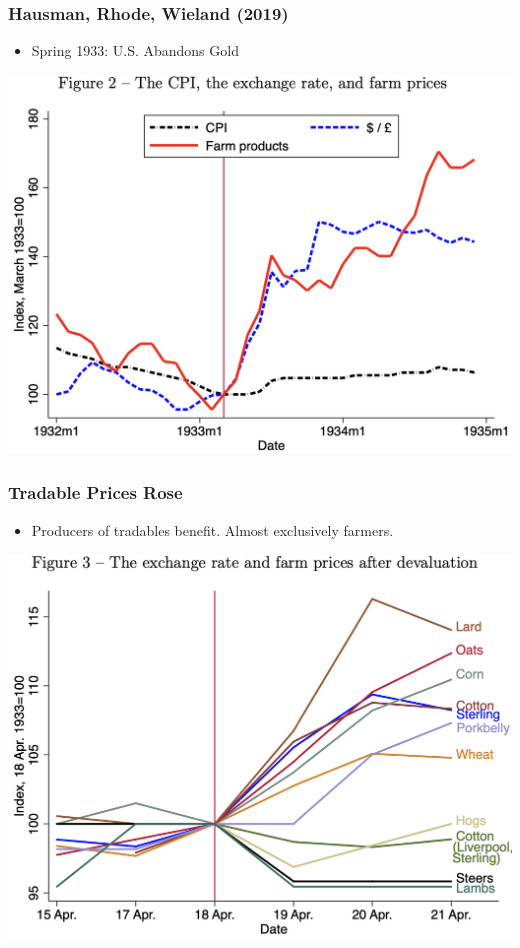 \documentclass[english,xcolor=svgnames]{beamer}
\begin{document}
\begin{frame}
\frametitle[alignment=center]{Hausman, Rhode, Wieland (2019)}
\begin{itemize}
	\item Spring 1933: U.S. Abandons Gold
\end{itemize}
\centering
\includegraphics[scale=0.5]{../../Images/HRWFIG2.png}
\end{frame}

\begin{frame}
\frametitle[alignment=center]{Tradable Prices Rose}
\begin{itemize}
	\item Producers of tradables benefit. Almost exclusively farmers.
\end{itemize}
\centering
\includegraphics[scale=0.5]{../../Images/HRWFIG3.png}
\end{frame}
\end{document}
